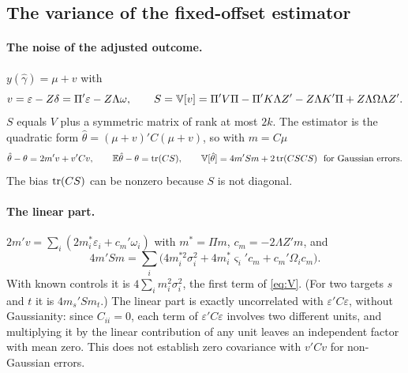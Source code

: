 \subsection{The variance of the fixed-offset estimator}\label{ctl:var}

\paragraph{The noise of the adjusted outcome.} $y(\hat\gamma)=\mu+v$ with
\begin{equation}\label{ctl:eq:v}
 v=\varepsilon-Z\delta=\Pi'\varepsilon-Z\Lambda\omega,\qquad
 S=\mathbb{V}[v]=\Pi'V\Pi-\Pi'K\Lambda Z'-Z\Lambda K'\Pi+Z\Lambda\Omega\Lambda Z'.
\end{equation}
$S$ equals $V$ plus a symmetric matrix of rank at most $2k$. The estimator is the quadratic form
$\hat\theta=(\mu+v)'C(\mu+v)$, so with $m=C\mu$
\begin{equation}\label{ctl:eq:exact}
 \hat\theta-\theta=2m'v+v'Cv,\qquad \mathbb{E}\hat\theta-\theta=\operatorname{tr}(CS),\qquad
 \mathbb{V}[\hat\theta]=4m'Sm+2\operatorname{tr}(CSCS)\ \text{ for Gaussian errors.}
\end{equation}
The bias $\operatorname{tr}(CS)$ can be nonzero because $S$ is not diagonal.

\paragraph{The linear part.} $2m'v=\sum_i(2m_i^*\varepsilon_i+c_m'\omega_i)$ with $m^*=\Pi m$, $c_m=-2\Lambda Z'm$, and
\begin{equation}\label{ctl:eq:Vlin}
 4m'Sm=\sum_i\bigl(4m_i^{*2}\sigma_i^2+4m_i^*\varsigma_i'c_m+c_m'\Omega_ic_m\bigr).
\end{equation}
With known controls it is $4\sum_im_i^2\sigma_i^2$, the first term of \eqref{eq:V}. (For two
targets $s$ and $t$ it is $4m_s'Sm_t$.) The linear part is exactly uncorrelated with $\varepsilon'C\varepsilon$,
without Gaussianity: since $C_{ii}=0$, each term of $\varepsilon'C\varepsilon$ involves two different units, and
multiplying it by the linear contribution of any unit leaves an independent factor with mean zero. This does not
establish zero covariance with $v'Cv$ for non-Gaussian errors.

